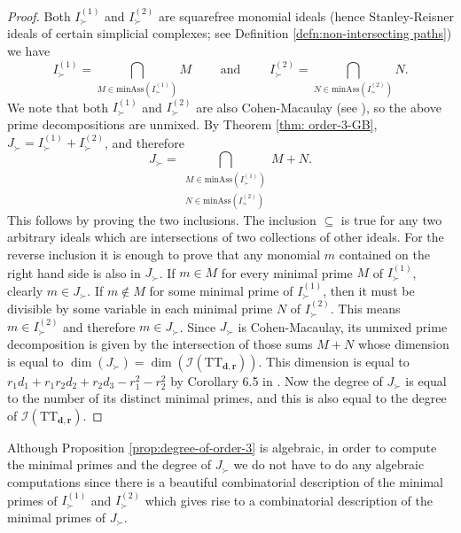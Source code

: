\documentclass[12pt]{article}
\theoremstyle{definition}
\numberwithin{theorem}{section}
\begin{document}
\begin{proof}
Both $I^{(1)}_\succ$ 
and $I^{(2)}_\succ$ are squarefree monomial ideals (hence Stanley-Reisner ideals of certain simplicial complexes; see Definition \ref{defn:non-intersecting paths}) we have
$$ I^{(1)}_\succ = \bigcap_{M \in \mathrm{minAss}(I^{(1)}_\succ)} M  \quad \quad  \mbox{  and  }  \quad \quad 
I^{(2)}_\succ = \bigcap_{N \in \mathrm{minAss}(I^{(2)}_\succ)} N.
$$
We note that both $I^{(1)}_\succ$
 and $I^{(2)}_\succ$ are also Cohen-Macaulay (see \cite[Chapter 4]{BCRV22}), 
 so the above prime decompositions are unmixed.
By Theorem \ref{thm: order-3-GB}, $J_\succ = I^{(1)}_\succ + I^{(2)}_\succ$, and therefore
$$J_\succ = \bigcap_{\substack{ M \in \mathrm{minAss}(I^{(1)}_\succ) \\ N \in \mathrm{minAss}(I^{(2)}_\succ)}} M + N.$$
This follows by proving the two inclusions. The inclusion $\subseteq$ is true for any two arbitrary ideals which are intersections of two collections of other ideals. For the reverse inclusion 
it is enough to prove that any monomial $m$ contained on the right hand side is also in $J_\succ$. If $m \in M$ for every minimal prime $M$ of $I^{(1)}_\succ$, clearly $m \in J_\succ$. If $m \not \in M$ for some minimal prime of $I^{(1)}_\succ$, then it must be divisible by some variable in each minimal prime $N$ of $I^{(2)}_\succ$. This means $m \in I^{(2)}_\succ$ and therefore $m \in J_\succ$.
Since $J_\succ$ is Cohen-Macaulay, its unmixed prime decomposition is given by 
the intersection of those sums $M+N$ whose dimension is equal to  
$\dim(J_\succ) = \dim(\mathcal{I}(\mathrm{TT}_{\mathbf{d}, \mathbf{r}}))$.
This dimension is equal to $r_1d_1 + r_1r_2d_2 + r_2d_3 - r_1^2-r_2^2$ by Corollary 6.5 in \cite{BFHP25}. Now the degree of $J_\succ$ is equal to the number of its distinct minimal primes, and this is also equal to the degree of $\mathcal{I}(\mathrm{TT}_{\mathbf{d}, \mathbf{r}})$. 
 \end{proof}
Although Proposition \ref{prop:degree-of-order-3} is algebraic, in order to compute the minimal primes and the degree of $J_\succ$ we do not have to do any algebraic computations since there is a beautiful combinatorial description of the minimal primes of $I^{(1)}_\succ$ and $I^{(2)}_\succ$ which gives rise to a combinatorial description of the minimal primes of $J_\succ$. 
\end{document}
